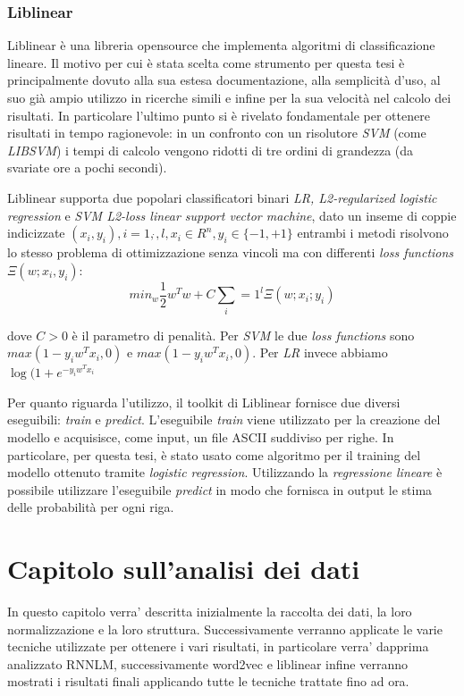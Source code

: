 \documentclass[a4paper,12pt,openright,twoside]{report}
\theoremstyle{definition}
\begin{document}
\subsection{Liblinear}
Liblinear è una libreria opensource che implementa algoritmi di classificazione lineare. Il motivo
per cui è stata scelta come strumento per questa
tesi è principalmente dovuto alla sua estesa documentazione, alla semplicità
d'uso, al suo già ampio utilizzo in ricerche simili e infine per la sua velocità nel calcolo dei risultati. 
In particolare l'ultimo punto si è rivelato fondamentale
per ottenere risultati in tempo ragionevole: in un confronto con un risolutore \emph{SVM} (come \emph{LIBSVM})
i tempi di calcolo vengono ridotti di tre ordini di grandezza (da svariate ore a pochi secondi).

Liblinear supporta due popolari classificatori binari \emph{LR, L2-regularized logistic regression} e 
\emph{SVM L2-loss linear support vector machine}, dato un inseme di coppie
indicizzate $(x_i,y_i),i=1,\dot{},l,x_i\in R^n, y_i \in \{-1,+1\}$ entrambi i metodi risolvono lo stesso
problema di ottimizzazione senza vincoli ma con differenti \emph{loss functions} $\Xi(w;x_i,y_i)$:
\begin{equation}
	min_w \frac{1}{2}w^Tw+C\sum_i=1^l\Xi(w;x_i;y_i)
	\label{eqn:liblinear1}
\end{equation}

dove $C > 0$ è il parametro di penalità. Per \emph{SVM} le due \emph{loss functions} sono $max(1-y_iw^Tx_i,0)$ e
$max(1-y_iw^Tx_i,0)$. Per \emph{LR} invece abbiamo $\log(1+e^{-y_iw^Tx_i}$

Per quanto riguarda l'utilizzo, il toolkit di Liblinear fornisce due diversi eseguibili: \emph{train} e 
\emph{predict}.
L'eseguibile \emph{train} viene utilizzato per la creazione del modello e acquisisce, come input, un file
ASCII suddiviso per righe. In particolare, per questa tesi, è stato usato come algoritmo 
per il training del modello ottenuto tramite \emph{logistic regression}.
Utilizzando la \emph{regressione lineare} è possibile utilizzare l'eseguibile \emph{predict} in modo 
che fornisca in output le stima delle probabilità per ogni riga.

\chapter{Capitolo sull'analisi dei dati}
In questo capitolo verra' descritta inizialmente la raccolta dei dati, la loro normalizzazione e la loro struttura.
Successivamente verranno applicate le varie tecniche utilizzate per ottenere i vari risultati, in particolare verra' dapprima
analizzato RNNLM, successivamente word2vec e liblinear infine verranno mostrati i risultati finali applicando
tutte le tecniche trattate fino ad ora.
\end{document}
